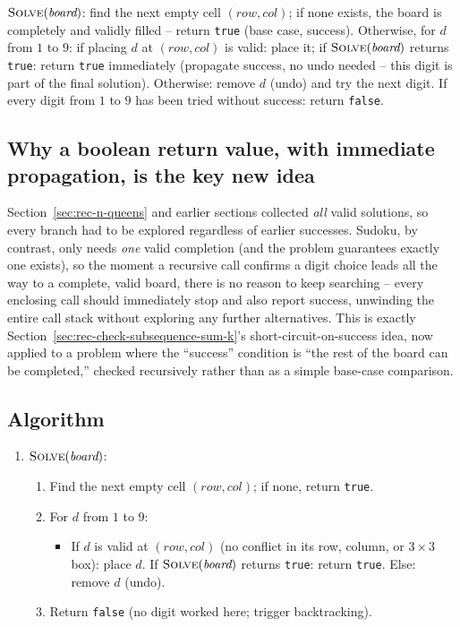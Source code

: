 \begin{ideabox}
$\textsc{Solve}(\textit{board})$: find the next empty cell
$(\textit{row},\textit{col})$; if none exists, the board is completely
and validly filled -- return \texttt{true} (base case, success).
Otherwise, for $d$ from $1$ to $9$: if placing $d$ at
$(\textit{row},\textit{col})$ is valid: place it; if
$\textsc{Solve}(\textit{board})$ returns \texttt{true}: return
\texttt{true} immediately (propagate success, no undo needed -- this
digit is part of the final solution). Otherwise: remove $d$ (undo) and
try the next digit. If every digit from $1$ to $9$ has been tried
without success: return \texttt{false}.
\end{ideabox}

\subsection*{Why a boolean return value, with immediate propagation, is the key new idea}

Section~\ref{sec:rec-n-queens} and earlier sections collected \emph{all}
valid solutions, so every branch had to be explored regardless of
earlier successes. Sudoku, by contrast, only needs \emph{one} valid
completion (and the problem guarantees exactly one exists), so the
moment a recursive call confirms a digit choice leads all the way to a
complete, valid board, there is no reason to keep searching -- every
enclosing call should immediately stop and also report success,
unwinding the entire call stack without exploring any further
alternatives. This is exactly Section~\ref{sec:rec-check-subsequence-sum-k}'s
short-circuit-on-success idea, now applied to a problem where the
``success'' condition is ``the rest of the board can be completed,''
checked recursively rather than as a simple base-case comparison.

\subsection*{Algorithm}

\begin{enumerate}
  \item $\textsc{Solve}(\textit{board})$:
  \begin{enumerate}
    \item Find the next empty cell $(\textit{row}, \textit{col})$; if
          none, return \texttt{true}.
    \item For $d$ from $1$ to $9$:
    \begin{itemize}
      \item If $d$ is valid at $(\textit{row}, \textit{col})$ (no
            conflict in its row, column, or $3\times3$ box): place
            $d$. If $\textsc{Solve}(\textit{board})$ returns
            \texttt{true}: return \texttt{true}. Else: remove $d$
            (undo).
    \end{itemize}
    \item Return \texttt{false} (no digit worked here; trigger
          backtracking).
  \end{enumerate}
\end{enumerate}

